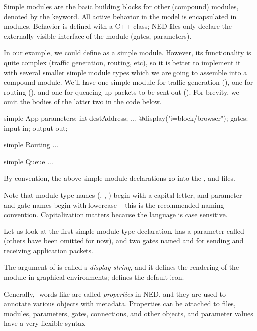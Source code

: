 Simple modules are the basic building blocks for other (compound) modules,
denoted by the  keyword.
All active behavior in the model is encapsulated in  modules.
Behavior is defined with a C++ class; NED files only declare the externally
visible interface of the module (gates, parameters).

In our example, we could define  as a simple module. However,
its functionality is quite complex (traffic generation, routing, etc),
so it is better to implement it with several smaller simple module types
which we are going to assemble into a compound module. We'll have
one simple module for traffic generation (), one for routing
(), and one for queueing up packets to be sent out ().
For brevity, we omit the bodies of the latter two in the code below.

\begin{ned}
simple App
{
    parameters:
        int destAddress;
        ...
        @display("i=block/browser");
    gates:
        input in;
        output out;
}

simple Routing
{
    ...
}

simple Queue
{
    ...
}
\end{ned}

By convention, the above simple module declarations go into the
,  and  files.

\begin{note}
    Note that module type names (, , )
    begin with a capital letter, and parameter and gate names begin with
    lowercase -- this is the recommended naming convention. Capitalization
    matters because the language is case sensitive.
\end{note}

Let us look at the first simple module type declaration.  has a
parameter called  (others have been omitted for now),
and two gates named  and  for sending and receiving
application packets.

The argument of  is called a \textit{display string},
and it defines the rendering of the module in graphical environments;
 defines the default icon.

Generally, -words like  are called \textit{properties}
in NED, and they are used to annotate various objects
with metadata. Properties can be attached to files, modules, parameters, gates,
connections, and other objects, and parameter values have a very flexible
syntax.


